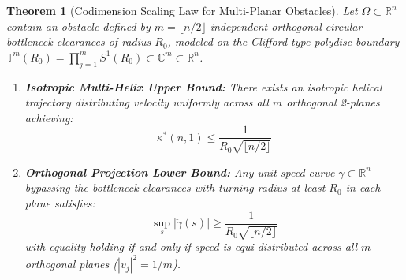 \documentclass[11pt,reqno]{amsart}
\newtheorem{theorem}{Theorem}[section]
\theoremstyle{definition}
\providecommand{\R}{\mathbb{R}}
\newcommand{\C}{\mathbb{C}}
\numberwithin{equation}{section}
\providecommand{\R}{\mathbb{R}}
\begin{document}
\begin{theorem}[Codimension Scaling Law for Multi-Planar Obstacles]
\label{thm:scaling_law}
Let $\Omega \subset \R^n$ contain an obstacle defined by $m = \lfloor n/2 \rfloor$ independent orthogonal circular bottleneck clearances of radius $R_0$, modeled on the Clifford-type polydisc boundary $\mathbb{T}^m(R_0) = \prod_{j=1}^m S^1(R_0) \subset \C^m \subset \R^n$.
\begin{enumerate}
    \item \textbf{Isotropic Multi-Helix Upper Bound:} There exists an isotropic helical trajectory distributing velocity uniformly across all $m$ orthogonal 2-planes achieving:
    \begin{equation}
    \kappa^*(n, 1) \le \frac{1}{R_0 \sqrt{\lfloor n/2 \rfloor}}
    \end{equation}
    \item \textbf{Orthogonal Projection Lower Bound:} Any unit-speed curve $\gamma \subset \R^n$ bypassing the bottleneck clearances with turning radius at least $R_0$ in each plane satisfies:
    \begin{equation}
    \sup_{s} |\ddot{\gamma}(s)| \ge \frac{1}{R_0 \sqrt{\lfloor n/2 \rfloor}}
    \end{equation}
    with equality holding \emph{if and only if} speed is equi-distributed across all $m$ orthogonal planes ($|v_j|^2 = 1/m$).
\end{enumerate}
\end{theorem}
\end{document}
